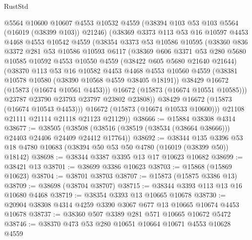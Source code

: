 \begin{lexlean}{RustStd}
\begin{coremodule}
          @5564
          @10600
          @10607
          @4553
          @10532
          @4559
          (@38394 @103 @53 @103 @5564 (@16019 (@38399 @103)) @21246)
          (@38369
            @3373
            @113
            @53
            @16
            @10597
            @4453
            @4468
            @4553
            @10542
            @4559
            (@38354
              @3373
              @53
              @10586
              @10595
              (@38360
                @836
                @3372
                @281
                @53
                @10586
                @10593
                @6117
                (@38369
                  @606
                  @3371
                  @53
                  @280
                  @5680
                  @10585
                  @10592
                  @4553
                  @10550
                  @4559
                  (@38422 @605 @5680 @21640 @21644)
                  (@38370
                    @113
                    @53
                    @16
                    @10582
                    @4453
                    @4468
                    @4553
                    @10560
                    @4559
                    (@38381 @10578 @10580 (@38390 @10568 @4559 @38405 @18191))
                    @38429
                    @16672
                    (@15873 (@16674 @10561 @4453)))
                  @16672
                  (@15873 (@16674 @10551 @10585)))
                @23787
                @23790
                @23793
                @23797
                @23802
                @23808))
            @38429
            @16672
            (@15873 (@16674 @10543 @4453)))
          @16672
          (@15873 (@16674 @10533 @10600)))
        @21108
        @21111
        @21114
        @21118
        @21123
        @21129))
@38666 := @15884 @38308 @4314
@38677 := @38505
    (@38508 (@38516 (@38519 (@38534 (@38664 @38666))) @24403 @24406 @24409 @24412 @17764))
@38692 := @38344
    @135
    @3396
    @53
    @18
    @4780
    @10683
    (@38394 @50 @53 @50 @4780 (@16019 (@38399 @50)) @18142)
@38698 := @38344 @3387 @3395 @13 @17 @10623 @10682
@38699 := @38421 @13
@38701 := @38699 @3386 @10623
@38703 := @15868 (@15869 @10623)
@38704 := @38701 @38703
@38707 := @15873 (@15875 @3386 @13)
@38709 := @38698 (@38704 @38707)
@38715 := @38344 @3393 @113 @13 @16 @10680 @4468
@38719 := @38354 @3393 @13 @10665 @10678
@38730 := @20904 @38308 @4314 @4259 @3390 @3067 @677 @13 @10665 @10674 @4453 @10678
@38737 := @38360 @507 @3389 @281 @571 @10665 @10672 @5472
@38746 := @38370 @473 @53 @280 @10651 @10664 @10671 @4553 @10628 @4559

\end{coremodule}
\end{lexlean}

